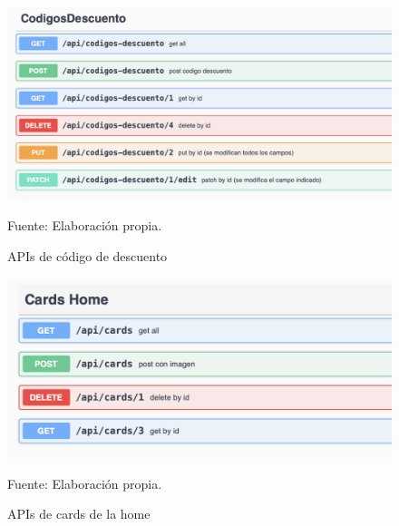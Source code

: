 \begin{figure}[H]
\begin{center}
\includegraphics[scale=0.7]{./Images/APIcodigodescuento.png}
\caption{APIs de código de descuento} Fuente: Elaboración propia.

\label{fig:fig5}

\end{center}
\end{figure}

\begin{figure}[H]
\begin{center}
\includegraphics[scale=0.8]{./Images/APIcardshome.png}
\caption{APIs de cards de la home} Fuente: Elaboración propia.

\label{fig:fig6}

\end{center}
\end{figure}

